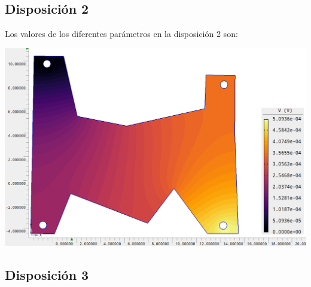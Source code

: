 \documentclass[11pt]{article}
\begin{document}
\subsection{Disposición 2}

Los valores de los diferentes parámetros en la disposición 2 son: 




\begin{minipage}[t]{0.45\linewidth} 
	\begin{center}
	\vspace{0.5em}
	
	\vspace{1.2em}
	\vspace{0.5em}
	
	\end{center}  
\end{minipage}
\hfill
\begin{minipage}[t]{0.45\linewidth}
	\begin{center}
	\includegraphics[width=1\linewidth]{Imagen Agros 1/Agros2.png}
	\end{center}  	
\end{minipage}

\subsection{Disposición 3}


\end{document}
